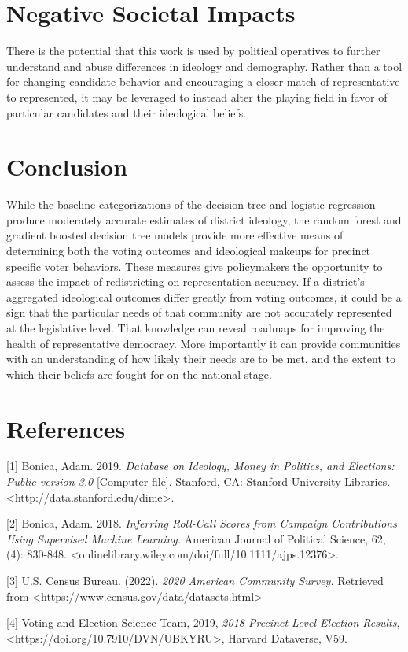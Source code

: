 \documentclass{article}
\begin{document}
\section{Negative Societal Impacts}

There is the potential that this work is used by political operatives to
further understand and abuse differences in ideology and demography. Rather
than a tool for changing candidate behavior and encouraging a closer match of representative to represented, it may be leveraged to instead alter the playing field in favor of particular candidates and their ideological beliefs.


\section{Conclusion}

While the baseline categorizations of the decision tree and logistic regression produce moderately accurate estimates of district ideology, the random forest and gradient boosted decision tree models provide more effective means of determining both the voting outcomes and ideological makeups for precinct specific voter behaviors. These measures give policymakers the opportunity to assess the impact of redistricting on representation accuracy. If a district’s aggregated ideological outcomes differ greatly  from voting outcomes, it could be a sign that the particular needs of that community are not accurately represented at the legislative level. That knowledge can reveal roadmaps for improving the health of representative democracy. More importantly it can provide communities with an understanding of how likely their needs are to be met, and the extent to which their beliefs are fought for on the national stage.



\newpage

\section*{References}

{
\small


[1] Bonica, Adam. 2019. {\it Database on Ideology, Money in Politics, and Elections: Public version 3.0} [Computer file]. Stanford, CA: Stanford University Libraries. <http://data.stanford.edu/dime>.

[2] Bonica, Adam. 2018. {\it Inferring Roll-Call Scores from Campaign Contributions Using Supervised Machine Learning.} American Journal of Political Science, 62, (4): 830-848. <onlinelibrary.wiley.com/doi/full/10.1111/ajps.12376>.

[3] U.S. Census Bureau. (2022). {\it 2020 American Community Survey.}  
Retrieved from <https://www.census.gov/data/datasets.html>

[4] Voting and Election Science Team, 2019, {\it 2018 Precinct-Level Election Results}, <https://doi.org/10.7910/DVN/UBKYRU>, Harvard Dataverse, V59.
}
\end{document}
